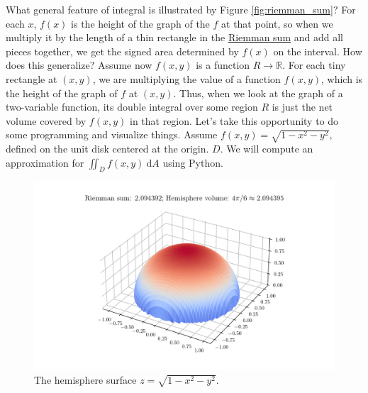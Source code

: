 
What general feature of integral is illustrated by Figure \ref{fig:riemman_sum}? For each $x$, $f(x)$ is the height of the graph of the $f$ at that point, so when we multiply it by the length of a thin rectangle in the \hyperref[eq:riemman_integral]{Riemman sum} and add all pieces together, we get the signed area determined by $f(x)$ on the interval. How does this generalize? Assume now $f(x,y)$ is a function $R\rightarrow \mathbb{R}$. For each tiny rectangle at $(x,y)$, we are multiplying the value of a function $f(x,y)$, which is the height of the graph of $f$ at $(x,y)$. Thus, when we look at the graph of a two-variable function, its double integral over some region $R$ is just the net volume covered by $f(x,y)$ in that region. Let's take this opportunity to do some programming and visualize things. Assume $f(x,y) = \sqrt{1-x^2-y^2}$, defined on the unit disk centered at the origin. $D$. We will compute an approximation for $\iint_D f(x,y) \ \mathrm{d} A$ using Python.

\begin{figure}[h!]
    \centering
    \includegraphics[width=\textwidth]{second_quarter/double_integral.png}
    \caption{The hemisphere surface $z = \sqrt{1-x^2-y^2}$.}
    \label{fig:hemisphere}
\end{figure}


